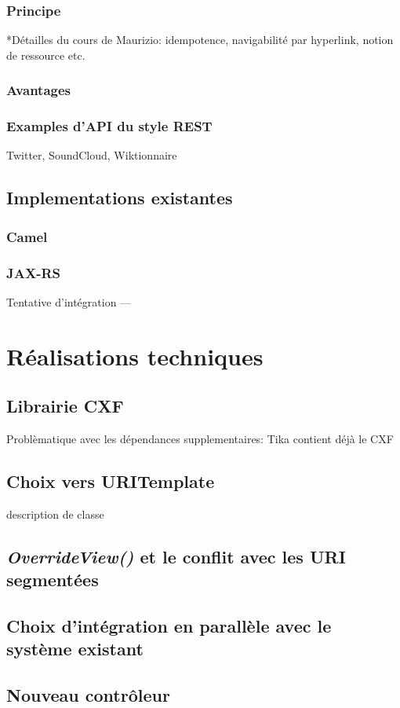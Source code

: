 \subsubsection{Principe}
*Détailles du cours de Maurizio: idempotence, navigabilité par hyperlink, 
notion de ressource etc.
\subsubsection{Avantages}
\subsubsection{Examples d'API du style REST}
Twitter, SoundCloud, Wiktionnaire
\subsection{Implementations existantes}
\subsubsection{Camel}
\subsubsection{JAX-RS}
Tentative d'intégration ---





\section{Réalisations techniques}
\subsection{Librairie CXF}
Problèmatique avec les dépendances supplementaires: 
Tika contient déjà le CXF
\subsection{Choix vers URITemplate}
description de classe
\subsection{\textit{OverrideView()} et le conflit avec les URI segmentées}
\subsection{Choix d'intégration en parallèle avec le système existant }
\subsection{Nouveau contrôleur}

